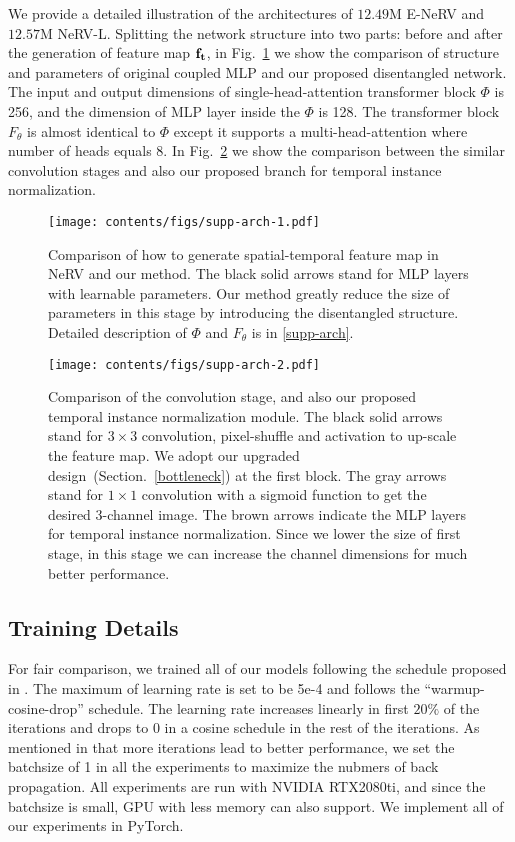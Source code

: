 \documentclass[runningheads]{llncs}
\begin{document}
We provide a detailed illustration of the architectures of $12.49$M E-NeRV and $12.57$M NeRV-L. Splitting the network structure into two parts: before and after the generation of feature map $\mathbf{f}_{\mathbf{t}}$, in Fig.~\ref{fig:comparison_first} we show the comparison of structure and parameters of original coupled MLP and our proposed disentangled network. The input and output dimensions of single-head-attention transformer block $\Phi$ is 256, and the dimension of MLP layer inside the $\Phi$ is 128. The transformer block $F_\theta$ is almost identical to $\Phi$ except it supports a multi-head-attention where number of heads equals 8. In Fig.~\ref{fig:comparison_second} we show the comparison between the similar convolution stages and also our proposed branch for temporal instance normalization.

\begin{figure}[h]
    \centering
    \texttt{[image: contents/figs/supp-arch-1.pdf]}
    \caption{Comparison of how to generate spatial-temporal feature map in NeRV and our method. The black solid arrows stand for MLP layers with learnable parameters. Our method greatly reduce the size of parameters in this stage by introducing the disentangled structure. Detailed description of $\Phi$ and $F_\theta$ is in \ref{supp-arch}.}
    \label{fig:comparison_first}
\end{figure}

\begin{figure}[h]
    \centering
    \texttt{[image: contents/figs/supp-arch-2.pdf]}
    \caption{Comparison of the convolution stage, and also our proposed temporal instance normalization module. The black solid arrows stand for $3\times 3$ convolution, pixel-shuffle and activation to up-scale the feature map. We adopt our upgraded design~(Section.~\ref{bottleneck}) at the first block. The gray arrows stand for $1\times 1$ convolution with a sigmoid function to get the desired 3-channel image. The brown arrows indicate the MLP layers for temporal instance normalization. Since we lower the size of first stage, in this stage we can increase the channel dimensions for much better performance.}
    \label{fig:comparison_second}
\end{figure}

\subsection{Training Details}

For fair comparison, we trained all of our models following the schedule proposed in \cite{chen2021nerv}. The maximum of learning rate is set to be 5e-4 and follows the ``warmup-cosine-drop'' schedule. The learning rate increases linearly in first $20\%$ of the iterations and drops to 0 in a cosine schedule in the rest of the iterations. As mentioned in \cite{chen2021nerv} that more iterations lead to better performance, we set the batchsize of 1 in all the experiments to maximize the nubmers of back propagation.  All experiments are run with NVIDIA RTX2080ti, and since the batchsize is small, GPU with less memory can also support. We implement all of our experiments in PyTorch.
\end{document}
